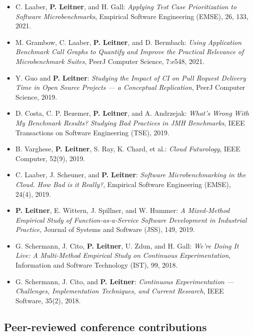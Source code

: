 \documentclass[a4paper,11pt]{article}
\begin{document}
\begin{itemize}[itemsep=0.2em]
\item C. Laaber, \textbf{P. Leitner}, and H. Gall: \emph{Applying Test Case Prioritization to Software Microbenchmarks}, Empirical Software Engineering (EMSE), 26, 133, 2021.
\item M. Grambow, C. Laaber, \textbf{P. Leitner}, and D. Bermbach: \emph{Using Application Benchmark Call Graphs to Quantify and Improve the Practical Relevance of Microbenchmark Suites}, PeerJ Computer Science, 7:e548, 2021.
\item Y. Guo and \textbf{P. Leitner}: \emph{Studying the Impact of CI on Pull Request Delivery Time in Open Source Projects --- a Conceptual Replication}, PeerJ Computer Science, 2019.
\item D. Costa, C. P. Bezemer, \textbf{P. Leitner}, and A. Andrzejak: \emph{What's Wrong With My Benchmark Results? Studying Bad Practices in JMH Benchmarks}, IEEE Transactions on Software Engineering (TSE), 2019.
\item B. Varghese, \textbf{P. Leitner}, S. Ray, K. Chard, et al.: \emph{Cloud Futurology}, IEEE Computer, 52(9), 2019.
\item C. Laaber, J. Scheuner, and \textbf{P. Leitner}: \emph{Software Microbenchmarking in the Cloud. How Bad is it Really?}, Empirical Software Engineering (EMSE), 24(4), 2019.
\item \textbf{P. Leitner}, E. Wittern, J. Spillner, and W. Hummer: \emph{A Mixed-Method Empirical Study of Function-as-a-Service Software Development in Industrial Practice}, Journal of Systems and Software (JSS), 149, 2019.
\item G. Schermann, J. Cito, \textbf{P. Leitner}, U. Zdun, and H. Gall: \emph{We're Doing It Live: A Multi-Method Empirical Study on Continuous Experimentation}, Information and Software Technology (IST), 99, 2018.
\item G. Schermann, J. Cito, and \textbf{P. Leitner}: \emph{Continuous Experimentation --- Challenges, Implementation Techniques, and Current Research}, IEEE Software, 35(2), 2018.
\end{itemize}

\subsection{Peer-reviewed conference contributions}
\end{document}
